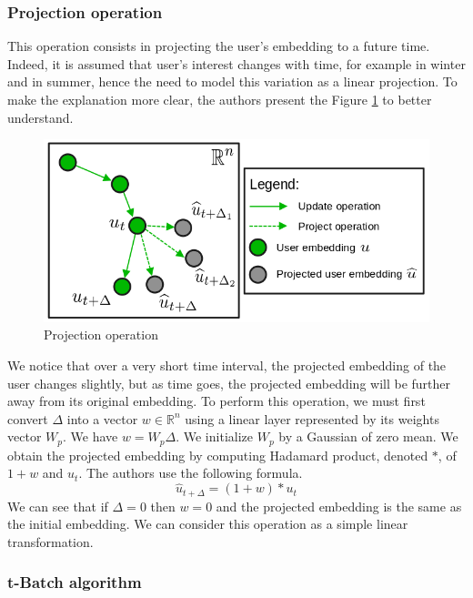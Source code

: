 \subsubsection{Projection operation}

This operation consists in projecting the user's embedding to a future time. Indeed, it is assumed that user's interest changes with time, for example in winter and in summer, hence the need to model this variation as a linear projection. To make the explanation more clear, the authors present the Figure \ref{Projection} to better understand.\\

\begin{figure}[H]
    \centering
    \includegraphics[scale = 0.4]{image/projection_operation.png}
    \caption{Projection operation}
   \label{Projection}
\end{figure}

We notice that over a very short time interval, the projected embedding of the user changes slightly, but as time goes, the projected embedding will be further away from its original embedding. To perform this operation, we must first convert $\Delta$ into a vector $w \in \mathbb{R}^n$ using a linear layer represented by its weights vector $W_p$. We have $w = W_p \Delta$. We initialize $W_p$ by a Gaussian of zero mean. We obtain the projected embedding by computing Hadamard product, denoted $*$, of $1+w$ and $u_t$. The authors use the following formula.
$$
\widehat u_{t+\Delta} = (1+w) * u_t
$$
We can see that if $\Delta = 0$ then $w=0$ and the projected embedding is the same as the initial embedding. We can consider this operation as a simple linear transformation.

\subsubsection{t-Batch algorithm}

